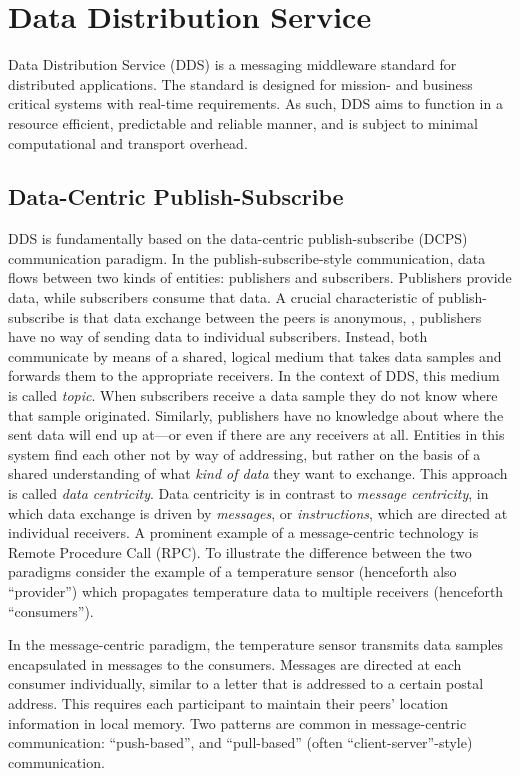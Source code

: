 \section{Data Distribution Service}

Data Distribution Service (DDS) is a messaging middleware standard \cite{dds-1.4-standard} for distributed applications. The standard is designed for mission- and business critical systems with real-time requirements. As such, DDS aims to function in a resource efficient, predictable and reliable manner, and is subject to minimal computational and transport overhead.

\subsection{Data-Centric Publish-Subscribe}
DDS is fundamentally based on the data-centric publish-subscribe (DCPS) communication paradigm. In the publish-subscribe-style communication, data flows between two kinds of entities: publishers and subscribers. Publishers provide data, while subscribers consume that data. A crucial characteristic of publish-subscribe is that data exchange between the peers is anonymous, \ie , publishers have no way of sending data to individual subscribers. Instead, both communicate by means of a shared, logical medium that takes data samples and forwards them to the appropriate receivers. In the context of DDS, this medium is called \emph{topic}. When subscribers receive a data sample they do not know where that sample originated. Similarly, publishers have no knowledge about where the sent data will end up at---or even if there are any receivers at all. Entities in this system find each other not by way of addressing, but rather on the basis of a shared understanding of what \emph{kind of data} they want to exchange. This approach is called \emph{data centricity}. Data centricity is in contrast to \emph{message centricity}, in which data exchange is driven by \emph{messages}, or \emph{instructions}, which are directed at individual receivers. A prominent example of a message-centric technology is Remote Procedure Call (RPC). To illustrate the difference between the two paradigms consider the example of a temperature sensor (henceforth also ``provider'') which propagates temperature data to multiple receivers (henceforth ``consumers''). 

In the message-centric paradigm, the temperature sensor transmits data samples encapsulated in messages to the consumers. Messages are directed at each consumer individually, similar to a letter that is addressed to a certain postal address. This requires each participant to maintain their peers' location information in local memory.  
Two patterns are common in message-centric communication: ``push-based'', and ``pull-based'' (often ``client-server''-style) communication.

